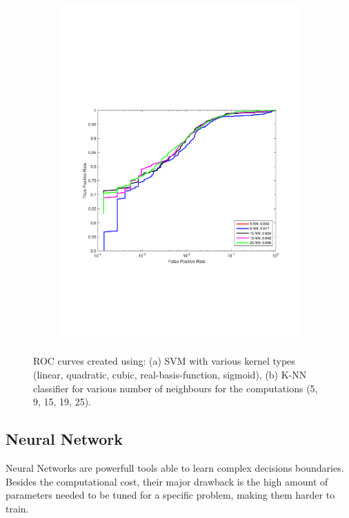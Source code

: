 \begin{figure}[h]
\begin{subfigure}[b]{0.49\textwidth}
    \includegraphics[width=\textwidth]{figures/K_NN.pdf}
    \caption{}
    \label{fig:K_NN}
  \end{subfigure}
  \caption{ROC curves created using: (a) SVM with various kernel types (linear, quadratic, cubic, real-basis-function, sigmoid), (b) K-NN classifier for various number of neighbours for the computations (5, 9, 15, 19, 25).}
\end{figure}

\subsection{Neural Network}
Neural Networks are powerfull tools able to learn complex decisions boundaries. Besides the computational cost, their major drawback is the high amount of parameters needed to be tuned for a specific problem, making them harder to train.

